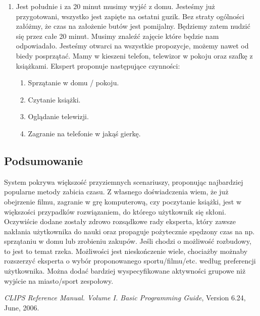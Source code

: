 \documentclass{article}
\begin{document}
\begin{enumerate}
	\item Jest południe i za 20 minut musimy wyjść z domu. Jesteśmy już 
	przygotowani, wszystko jest zapięte na ostatni guzik. Bez straty 
	ogólności załóżmy, że czas na założenie butów jest pomijalny. 
	Będziemy zatem nudzić się przez całe 20 minut. Musimy znaleźć zajęcie 
	które będzie nam odpowiadało. Jesteśmy otwarci na wszystkie propozycje,
	możemy nawet od biedy posprzątać. Mamy w kieszeni telefon, telewizor w 
	pokoju oraz szafkę z książkami. Ekspert proponuje następujące czynności:
	\begin{enumerate}
		\item Sprzątanie w domu / pokoju.
		\item Czytanie książki.
		\item Oglądanie telewizji.
		\item Zagranie na telefonie w jakąś gierkę.	
	\end{enumerate}
\end{enumerate}

\subsection{Podsumowanie}
System pokrywa większość przyziemnych scenariuszy, proponując najbardziej popularne metody zabicia czasu. Z własnego doświadczenia wiem, że już obejrzenie filmu, zagranie w grę komputerową, czy poczytanie książki, jest w większości przypadków rozwiązaniem, do którego użytkownik się skłoni. Oczywiście dodane zostały zdrowo rozsądkowe rady eksperta, który zawsze nakłania użytkownika do nauki oraz propaguje pożytecznie spędzony czas na np. sprzątaniu w domu lub zrobieniu zakupów.
\newline
\newline
Jeśli chodzi o możliwość rozbudowy, to jest to temat rzeka. Możliwości jest
nieskończenie wiele, chociażby możnaby rozszerzyć eksperta o wybór 
proponowanego sportu/filmu/etc. według preferencji użytkownika. 
Można dodać bardziej wyspecyfikowane aktywności grupowe niż wyjście na 
miasto/sport zespołowy.
\begin{thebibliography}{9} %

\emph{CLIPS Reference Manual. Volume I. Basic Programming Guide},
Version 6.24, June, 2006.

\end{thebibliography}
\end{document}
